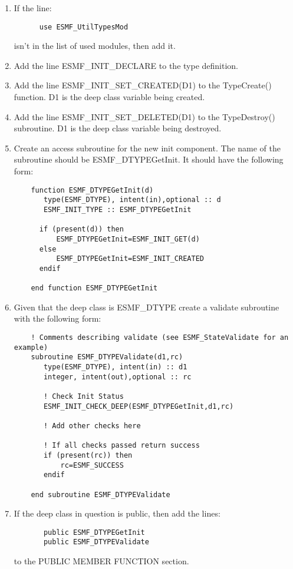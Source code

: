 \begin{enumerate}
\item If the line:
\begin{verbatim}
      use ESMF_UtilTypesMod
\end{verbatim} 
    isn't in the list of used modules, then add it.  
\item Add the line ESMF\_INIT\_DECLARE to the type definition.
\item Add the line ESMF\_INIT\_SET\_CREATED(D1) to the
      TypeCreate() function. D1 is the deep class variable
      being created.
\item Add the line ESMF\_INIT\_SET\_DELETED(D1) to the
      TypeDestroy() subroutine. D1 is the deep class
      variable being destroyed.
\item Create an access subroutine for the new init component.
    The name of the subroutine should be ESMF\_DTYPEGetInit.
    It should have the following form:
\begin{verbatim}
    function ESMF_DTYPEGetInit(d)
       type(ESMF_DTYPE), intent(in),optional :: d
       ESMF_INIT_TYPE :: ESMF_DTYPEGetInit

      if (present(d)) then
          ESMF_DTYPEGetInit=ESMF_INIT_GET(d)
      else
          ESMF_DTYPEGetInit=ESMF_INIT_CREATED
      endif

    end function ESMF_DTYPEGetInit
\end{verbatim}

\item Given that the deep class is ESMF\_DTYPE create a validate subroutine
 with the following form:
\begin{verbatim}
    ! Comments describing validate (see ESMF_StateValidate for an example)
    subroutine ESMF_DTYPEValidate(d1,rc)
       type(ESMF_DTYPE), intent(in) :: d1
       integer, intent(out),optional :: rc

       ! Check Init Status
       ESMF_INIT_CHECK_DEEP(ESMF_DTYPEGetInit,d1,rc)

       ! Add other checks here

       ! If all checks passed return success
       if (present(rc)) then
           rc=ESMF_SUCCESS
       endif

    end subroutine ESMF_DTYPEValidate
\end{verbatim}

\item If the deep class in question is public, then
    add the lines:
\begin{verbatim}
       public ESMF_DTYPEGetInit
       public ESMF_DTYPEValidate
\end{verbatim}
    to the PUBLIC MEMBER FUNCTION section.


\end{enumerate}
